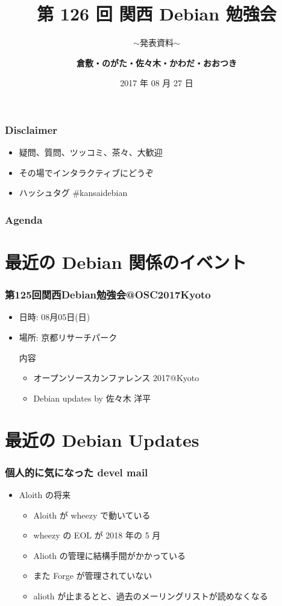 \documentclass[cjk,dvipdfmx,12pt,compress,%
hyperref={bookmarks=true,bookmarksnumbered=true,bookmarksopen=false,%
colorlinks=false,%
pdftitle={第 120 回 関西 Debian 勉強会},%
pdfauthor={倉敷・のがた・佐々木・かわだ・おおつき},%
pdfsubject={資料},%
}]{beamer}
\title{第 126 回 関西 Debian 勉強会}
\subtitle{$\sim$発表資料$\sim$}
\author[おおつき]{{\large\bf 倉敷・のがた・佐々木・かわだ・おおつき}}
\institute[Debian JP]{{\normalsize\tt 関西 Debian 勉強会}}
\date{{\small 2017 年 08 月 27 日}}
\begin{document}
\begin{frame}
\titlepage
\end{frame}

\begin{frame}[fragile]
  \frametitle{Disclaimer}
  \begin{itemize}
  \item 疑問、質問、ツッコミ、茶々、\alert{大歓迎}
  \item その場でインタラクティブにどうぞ
  \item ハッシュタグ \#kansaidebian
  \end{itemize}
\end{frame}

\frametitle{Agenda}

\tableofcontents

\section{最近の Debian 関係のイベント}
\begin{frame}[fragile]
  \frametitle{第125回関西Debian勉強会@OSC2017Kyoto}
  \begin{itemize}
  \item 日時: 08月05日(日)
  \item 場所: 京都リサーチパーク
  \begin{block}{内容}
    \begin{itemize}
        \item{オープンソースカンファレンス 2017@Kyoto}
        \item{Debian updates by 佐々木 洋平}
    \end{itemize}
  \end{block}
\end{itemize}
\end{frame}

\section{最近の Debian Updates}

\begin{frame}[fragile]
  \frametitle{個人的に気になった devel mail}
  \begin{itemize}
    \item Aloith の将来
    \begin{itemize}
       \item Aloith が wheezy で動いている
       \item wheezy の EOL が 2018 年の 5 月
       \item Alioth の管理に結構手間がかかっている
       \item また Forge が管理されていない
       \item alioth が止まるとと、過去のメーリングリストが読めなくなる
    \end{itemize}
  \end{itemize}
\end{frame}
\end{document}
